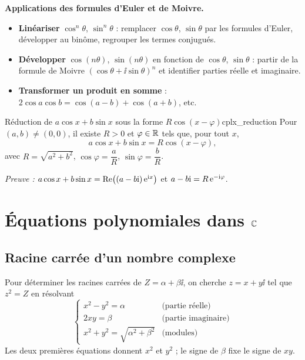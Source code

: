 \begin{astucebac}
	\textbf{Applications des formules d'Euler et de Moivre.}
	\begin{itemize}[label=\textbullet]
		\item \textbf{Linéariser} $\cos^n\theta$, $\sin^n\theta$ : remplacer
		$\cos\theta$, $\sin\theta$ par les formules d'Euler, développer au
		binôme, regrouper les termes conjugués.
		\item \textbf{Développer} $\cos(n\theta)$, $\sin(n\theta)$ en fonction
		de $\cos\theta$, $\sin\theta$ : partir de la formule de Moivre
		$(\cos\theta + \ii\sin\theta)^n$ et identifier parties réelle et
		imaginaire.
		\item \textbf{Transformer un produit en somme} :
		$2\cos a\cos b = \cos(a-b) + \cos(a+b)$, etc.
	\end{itemize}
\end{astucebac}

\begin{propriete}{Réduction de $a\cos x + b\sin x$ sous la forme $R\cos(x-\varphi)$}{cplx_reduction}
	Pour $(a,b) \neq (0,0)$, il existe $R > 0$ et $\varphi \in \mathbb{R}$ tels que,
	pour tout $x$,
	$$
	a\cos x + b\sin x = R\cos(x - \varphi),
	$$
	avec $R = \sqrt{a^2 + b^2}$, $\cos\varphi = \dfrac{a}{R}$,
	$\sin\varphi = \dfrac{b}{R}$.

	\emph{Preuve :} $a\cos x + b\sin x = \mathrm{Re}\bigl((a - b\mathrm{i})\,\mathrm{e}^{\mathrm{i} x}\bigr)$
	et $a - b\mathrm{i} = R\,\mathrm{e}^{-\mathrm{i}\varphi}$.
\end{propriete}


\section{Équations polynomiales dans $\mathbb{C}$}

\subsection{Racine carrée d'un nombre complexe}

\begin{methode}
	Pour déterminer les racines carrées de $Z = \alpha + \beta\ii$, on cherche
	$z = x + y\ii$ tel que $z^2 = Z$ en résolvant
	$$
	\begin{cases}
		x^2 - y^2 = \alpha & \text{(partie réelle)}\\
		2xy = \beta & \text{(partie imaginaire)}\\
		x^2 + y^2 = \sqrt{\alpha^2 + \beta^2} & \text{(modules)}
	\end{cases}
	$$
	Les deux premières équations donnent $x^2$ et $y^2$ ; le signe de $\beta$
	fixe le signe de $xy$.
\end{methode}

